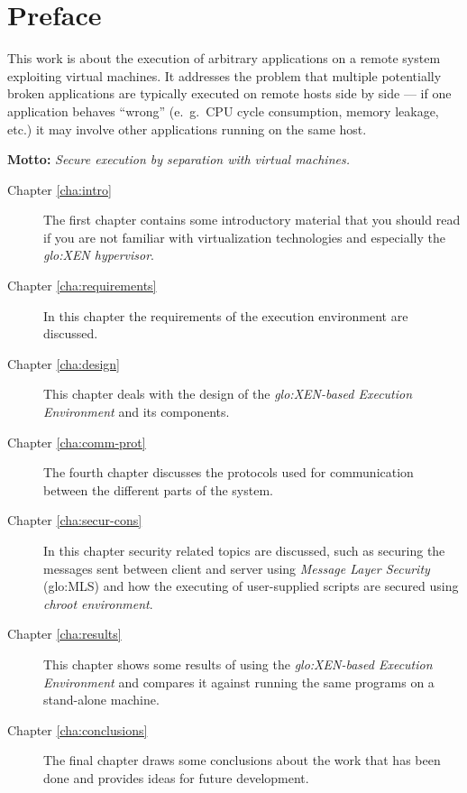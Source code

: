
\chapter{Preface}
\thispagestyle{empty}

This work  is about  the execution of  arbitrary applications on  a remote
system exploiting virtual machines. It addresses the problem that multiple
potentially  broken applications  are typically  executed on  remote hosts
side by  side ---  if one application  behaves ``wrong''  (e.~g.~CPU cycle
consumption,  memory  leakage, etc.)  it  may  involve other  applications
running on the same host.

\textbf{Motto:} \emph{Secure execution by separation with virtual machines.}
\vfill

\begin{description}
\item[Chapter   \ref{cha:intro}]   The   first   chapter   contains   some
  introductory material that you should  read if you are not familiar with
  virtualization  technologies   and  especially  the  \emph{\gls{glo:XEN}
    hypervisor}.
  
\item[Chapter \ref{cha:requirements}] In  this chapter the requirements of
  the execution environment are discussed.
  
\item[Chapter \ref{cha:design}] This chapter  deals with the design of the
  \emph{\gls{glo:XEN}-based Execution Environment} and its components.
  
\item[Chapter  \ref{cha:comm-prot}]  The   fourth  chapter  discusses  the
  protocols  used for  communication between  the different  parts  of the
  system.
  
\item[Chapter  \ref{cha:secur-cons}]  In  this  chapter  security  related
  topics are discussed, such as  securing the messages sent between client
  and server  using \emph{Message Layer Security}  (\gls{glo:MLS}) and how
  the executing  of user-supplied  scripts are secured  using \emph{chroot
    environment}.
  
\item[Chapter \ref{cha:results}] This chapter  shows some results of using
  the  \emph{\gls{glo:XEN}-based Execution  Environment}  and compares  it
  against running the same programs on a stand-alone machine.
  
\item[Chapter   \ref{cha:conclusions}]  The   final  chapter   draws  some
  conclusions about  the work  that has been  done and provides  ideas for
  future development.
  
\end{description}

\clearpage

